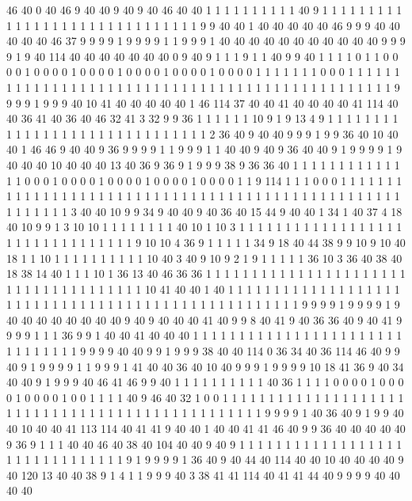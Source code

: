 46 40 0 40 46 9 40 40 9 40 9 40 46 40 40 1 1 1 1 1
1 1 1 1 1 40 9 1 1 1 1 1 1 1 1 1 1 1 1 1
1 1 1 1 1 1 1 1 1 1 1 1 1 1 1 1 1 9 9 40
40 1 40 40 40 40 40 46 9 9 9 40 40 40 40 40 46 37 9 9
9 9 1 9 9 9 9 1 1 9 9 9 1 40 40 40 40 40 40 40
40 40 40 40 9 9 9 9 1 9 40 114 40 40 40 40 40 40 40 0
9 40 9 1 1 1 9 1 1 40 9 9 40 1 1 1 1 0 1 1
0 0 0 0 1 0 0 0 0 1 0 0 0 0 1 0 0 0 0 1
0 0 0 0 1 0 0 0 0 1 1 1 1 1 1 1 0 0 0 1
1 1 1 1 1 1 1 1 1 1 1 1 1 1 1 1 1 1 1 1
1 1 1 1 1 1 1 1 1 1 1 1 1 1 1 1 1 1 1 1
1 1 1 1 1 1 1 9 9 9 9 1 9 9 9 40 10 41 40 40
40 40 40 1 46 114 37 40 40 41 40 40 40 40 41 114 40 40 36 41
40 36 40 46 32 41 3 32 9 9 36 1 1 1 1 1 1 10 9 1
9 13 4 9 1 1 1 1 1 1 1 1 1 1 1 1 1 1 1 1
1 1 1 1 1 1 1 1 1 1 1 1 1 1 2 36 40 9 40 40
9 9 9 1 9 9 36 40 10 40 40 1 46 46 9 40 40 9 36 9
9 9 9 1 1 9 9 9 1 1 40 40 9 40 9 36 40 40 9 1
9 9 9 9 1 9 40 40 40 10 40 40 40 13 40 36 9 36 9 1
9 9 9 38 9 36 36 40 1 1 1 1 1 1 1 1 1 1 1 1
1 1 0 0 0 1 0 0 0 0 1 0 0 0 0 1 0 0 0 0
1 0 0 0 0 1 1 9 114 1 1 1 0 0 0 1 1 1 1 1
1 1 1 1 1 1 1 1 1 1 1 1 1 1 1 1 1 1 1 1
1 1 1 1 1 1 1 1 1 1 1 1 1 1 1 1 1 1 1 1
1 1 1 1 1 1 1 1 1 1 1 1 3 40 40 10 9 9 34 9
40 40 9 40 36 40 15 44 9 40 40 1 34 1 40 37 4 18 40 10
9 9 1 3 10 10 1 1 1 1 1 1 1 1 40 10 1 10 3 1
1 1 1 1 1 1 1 1 1 1 1 1 1 1 1 1 1 1 1 1
1 1 1 1 1 1 1 1 1 1 1 9 10 10 4 36 9 1 1 1
1 1 34 9 18 40 44 38 9 9 10 9 10 40 18 1 1 10 1 1
1 1 1 1 1 1 1 1 10 40 3 40 9 10 9 2 1 9 1 1
1 1 1 36 10 3 36 40 38 40 18 38 14 40 1 1 1 10 1 36
13 40 46 36 36 1 1 1 1 1 1 1 1 1 1 1 1 1 1 1
1 1 1 1 1 1 1 1 1 1 1 1 1 1 1 1 1 1 1 1
1 1 10 41 40 40 1 40 1 1 1 1 1 1 1 1 1 1 1 1
1 1 1 1 1 1 1 1 1 1 1 1 1 1 1 1 1 1 1 1
1 1 1 1 1 1 1 1 1 1 1 1 1 1 1 1 1 1 1 9
9 9 9 1 9 9 9 9 1 9 40 40 40 40 40 40 40 40 9 40
9 40 40 40 41 40 9 9 8 40 41 9 40 36 36 40 9 40 41 9
9 9 9 1 1 1 36 9 9 1 40 40 41 40 40 40 1 1 1 1
1 1 1 1 1 1 1 1 1 1 1 1 1 1 1 1 1 1 1 1
1 1 1 1 1 1 1 9 9 9 9 40 40 9 9 1 9 9 9 38
40 40 114 0 36 34 40 36 114 46 40 9 9 40 9 1 9 9 9 9
1 1 9 9 9 1 41 40 40 36 40 10 40 9 9 9 1 9 9 9
9 10 18 41 36 9 40 34 40 40 9 1 9 9 9 40 46 41 46 9
9 40 1 1 1 1 1 1 1 1 1 1 40 36 1 1 1 1 0 0
0 0 1 0 0 0 0 1 0 0 0 0 1 0 0 1 1 1 1 40
9 46 40 32 1 0 0 1 1 1 1 1 1 1 1 1 1 1 1 1
1 1 1 1 1 1 1 1 1 1 1 1 1 1 1 1 1 1 1 1
1 1 1 1 1 1 1 1 1 1 1 1 1 1 1 9 9 9 9 1
40 36 40 9 1 9 9 40 40 10 40 40 41 113 114 40 41 41 9 40
40 1 40 40 41 41 46 40 9 9 36 40 40 40 40 40 9 36 9 1
1 1 40 40 46 40 38 40 104 40 40 9 40 9 1 1 1 1 1 1
1 1 1 1 1 1 1 1 1 1 1 1 1 1 1 1 1 1 1 1
1 1 1 1 1 9 1 9 9 9 9 1 36 40 9 40 44 40 114 40
40 10 40 40 40 40 9 40 120 13 40 40 38 9 1 4 1 1 9 9
9 40 3 38 41 41 114 40 41 41 44 40 9 9 9 9 40 40 40 40
